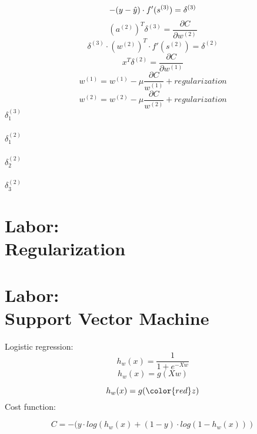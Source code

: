 \documentclass[12pt]{article}
\begin{document}
\begin{equation}
-(y-\hat{y}) \cdot f'(s^{(3)}) = \delta^{(3)}\\
\end{equation}
\begin{equation}
(a^{(2)})^T \delta^{(3)} =  \frac{\partial C}{\partial w^{(2)}}
\end{equation}
\begin{equation}
 \delta ^{(3)} \cdot (w^{(2)})^T \cdot f'(s^{(2)})= \delta ^{(2)}
\end{equation}
\begin{equation}
x^T \delta^{(2)} =  \frac{\partial C}{\partial w^{(1)}}
\end{equation}
{\color{red}
\begin{equation}
w^{(1)} = w^{(1)} - \mu \frac{\partial C}{w^{(1)}}+ regularization 
\end{equation}
\begin{equation}
w^{(2)} = w^{(2)} - \mu \frac{\partial C}{w^{(2)}}+ regularization 
\end{equation}
$\delta_1^{(3)}$\\
\\
$\delta_1^{(2)}$\\
\\
$\delta_2^{(2)}$\\
\\
$\delta_3^{(2)}$\\

}
\newpage
\section{Labor:\\ \large Regularization}
\newpage
\section{Labor:\\ \large Support Vector Machine}
Logistic regression:
\begin{equation}
h_w(x)=\frac{1}{1+e^{-Xw}}
\end{equation}
\begin{equation}
h_w(x)=g(Xw)
\end{equation}

\begin{equation}
h_w(x)=g({\color{red}z})
\end{equation}
Cost function:

\begin{equation}
C = -(y \cdot log(h_w(x)+(1-y)\cdot log(1-h_w(x)))
\end{equation}
\end{document}
